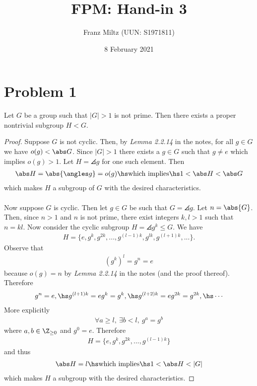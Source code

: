 \documentclass{article}
\begin{document}
\title{FPM: Hand-in 3}
\author{Franz Miltz (UUN: S1971811)}
\date{8 February 2021}
\maketitle

\section*{Problem 1}

\begin{claim*}
	Let $G$ be a group such that $|G|>1$ is not prime. Then
	there exists a proper nontrivial subgroup $H<G$.
\end{claim*}

\begin{proof}
	Suppose $G$ is not cyclic. Then, by \emph{Lemma 2.2.14} in the notes,
	for all $g\in G$ we have $o(g)<\abs G$. Since $|G|>1$ there exists
	a $g\in G$ such that $g\not=e$ which implies $o(g)>1$.
	Let $H=\angles g$ for one such element. Then
	\begin{align*}
		\abs H = \abs{\angles g} = o(g) \hs\text{which implies}\hs 1 < \abs H < \abs G
	\end{align*}
	which makes $H$ a subgroup of $G$ with
	the desired characteristics.\\\\
	Now suppose $G$ is cyclic. Then let $g\in G$ be such that
	$G=\angles g$. Let $n=\abs{G}$. Then, since $n>1$ and $n$ is not prime,
	there exist integers $k,l>1$ such that $n=kl$.
	Now consider the cyclic subgroup $H=\angles{g^k}\leq G$. We have
	\begin{align*}
		H =\{e, g^k, g^{2k}, ..., g^{(l-1)k}, g^{lk}, g^{(l+1)k}, ...\}.
	\end{align*}
	Observe that
	\begin{align*}
		\left(g^k\right)^l = g^n = e
	\end{align*}
	because $o(g)=n$ by \emph{Lemma 2.2.14} in the notes (and the proof
	thereof). Therefore
	\begin{align*}
		g^n = e,\hs g^{(l+1)k} = eg^k = g^k, \hs g^{(l+2)k}=eg^{2k}=g^{2k},\hs \cdots
	\end{align*}
	More explicitly
	\begin{align*}
		\forall a \geq l,\: \exists b<l,\: g^a = g^b
	\end{align*}
	where $a,b\in\Z_{\geq 0}$ and $g^0 = e$. Therefore
	\begin{align*}
		H = \{e, g^k, g^{2k}, ..., g^{(l-1)k}\}
	\end{align*}
	and thus
	\begin{align*}
		\abs H = l \hs\text{which implies}\hs 1 < \abs H < |G|
	\end{align*}
	which makes $H$ a subgroup with the desired characteristics.
\end{proof}
\end{document}
